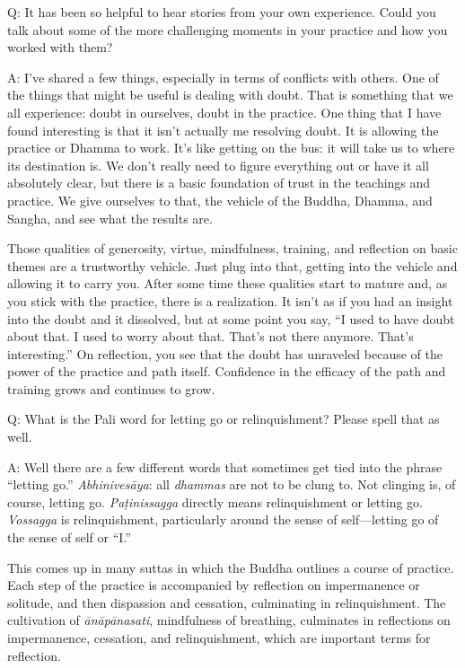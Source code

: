 \vspace{\the\qaskip}
Q: It has been so helpful to hear stories from your own experience.
Could you talk about some of the more challenging moments in your
practice and how you worked with them?

\vspace{\the\qaskip}
A: I’ve shared a few things, especially in terms of conflicts with
others. One of the things that might be useful is dealing with doubt.
That is something that we all experience: doubt in ourselves, doubt in
the practice. One thing that I have found interesting is that it isn’t
actually me resolving doubt. It is allowing the practice or Dhamma to
work. It’s like getting on the bus: it will take us to where its
destination is. We don’t really need to figure everything out or have it
all absolutely clear, but there is a basic foundation of trust in the
teachings and practice. We give ourselves to that, the vehicle of the
Buddha, Dhamma, and Sangha, and see what the results are.

Those qualities of generosity, virtue, mindfulness, training, and
reflection on basic themes are a trustworthy vehicle. Just plug into
that, getting into the vehicle and allowing it to carry you. After some
time these qualities start to mature and, as you stick with the
practice, there is a realization. It isn’t as if you had an insight into
the doubt and it dissolved, but at some point you say, “I used to have
doubt about that. I used to worry about that. That’s not there anymore.
That’s interesting.” On reflection, you see that the doubt has unraveled
because of the power of the practice and path itself. Confidence in the
efficacy of the path and training grows and continues to grow.

\vspace{\the\qaskip}
Q: What is the Pali word for letting go or relinquishment? Please spell
that as well.

\vspace{\the\qaskip}
A: Well there are a few different words that sometimes get tied into the
phrase “letting go.” \emph{Abhinivesāya}: all \emph{dhammas} are not to
be clung to. Not clinging is, of course, letting go. \emph{Paṭinissagga}
directly means relinquishment or letting go. \emph{Vossagga} is
relinquishment, particularly around the sense of self—letting go of the
sense of self or “I.”

This comes up in many suttas in which the Buddha outlines a course of
practice. Each step of the practice is accompanied by reflection on
impermanence or solitude, and then dispassion and cessation, culminating
in relinquishment. The cultivation of \emph{ānāpānasati}, mindfulness of
breathing, culminates in reflections on impermanence, cessation, and
relinquishment, which are important terms for reflection.

